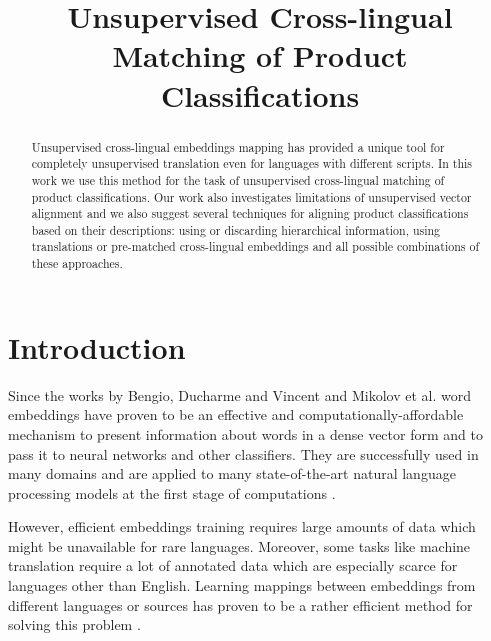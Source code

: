 \documentclass[conference]{IEEEtran}
\begin{document}
\title{Unsupervised Cross-lingual Matching of Product Classifications}
\date{}%

\author{

}

\maketitle

\begin{abstract}
Unsupervised cross-lingual embeddings mapping has provided a unique tool for completely unsupervised translation even for languages with different scripts. In this work we use this method for the task of unsupervised cross-lingual matching of product classifications. Our work also investigates limitations of unsupervised vector alignment and we also suggest several techniques for aligning product classifications based on their descriptions: using or discarding hierarchical information, using translations or pre-matched cross-lingual embeddings and all possible combinations of these approaches.
\end{abstract}

\section{Introduction}
Since the works by Bengio, Ducharme and Vincent \cite{bengio} and Mikolov et al. \cite{mikolov-representations-2013} word embeddings have proven to be an effective and computationally-affordable mechanism to present information about words in a dense vector form and to pass it to neural networks and other classifiers. They are successfully used in many domains and are applied to many state-of-the-art natural language processing models at the first stage of computations \cite{levy-goldberg-2015}.

However, efficient embeddings training requires large amounts of data which might be unavailable for rare languages. Moreover, some tasks like machine translation require a lot of annotated data which are especially scarce for languages other than English. Learning mappings between embeddings from different languages or sources has proven to be a rather efficient method for solving this problem \cite{ruder-survey}.
\end{document}
